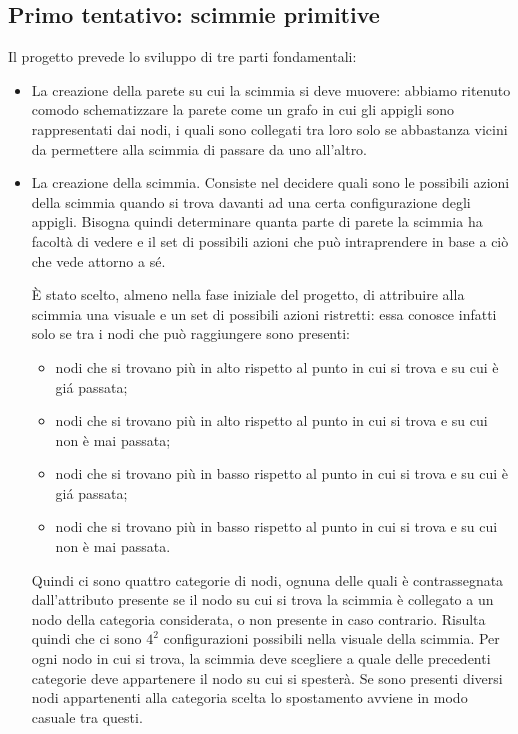 \documentclass{article}
\begin{document}
	\subsection{Primo tentativo: scimmie primitive}
	Il progetto prevede lo sviluppo di tre parti fondamentali:
	\begin{itemize}
	\item La creazione della parete su cui la scimmia si deve muovere: abbiamo ritenuto comodo schematizzare la parete come un grafo in cui gli appigli sono rappresentati dai nodi, i quali sono collegati tra loro solo se abbastanza vicini da permettere alla scimmia di passare da uno all'altro.
	\item La creazione della scimmia. Consiste nel decidere quali sono le possibili azioni della scimmia quando si trova davanti ad una certa configurazione degli appigli. Bisogna quindi determinare quanta parte di parete la scimmia ha facolt\`{a} di vedere e il set di possibili azioni che pu\`{o} intraprendere in base a ci\`{o} che vede attorno a s\'{e}. 

	\`{E} stato scelto, almeno nella fase iniziale del progetto, di attribuire alla scimmia una visuale e un set di possibili azioni ristretti: essa conosce infatti solo se tra i nodi che pu\`{o} raggiungere sono presenti:
	\begin{itemize}
		\item nodi che si trovano pi\`{u} in alto rispetto al punto in cui si trova e su cui \`{e} gi\'{a} passata;
		\item nodi che si trovano pi\`{u} in alto rispetto al punto in cui si trova e su cui non \`{e} mai passata;
		\item nodi che si trovano pi\`{u} in basso rispetto al punto in cui si trova e su cui \`{e} gi\'{a} passata;
		\item nodi che si trovano pi\`{u} in basso rispetto al punto in cui si trova e su cui non \`{e} mai passata.
	\end{itemize}

Quindi ci sono quattro categorie di nodi, ognuna delle quali \`{e} contrassegnata dall'attributo presente se il nodo su cui si trova la scimmia \`{e} collegato a un nodo della categoria considerata, o non presente in caso contrario.
Risulta quindi che ci sono $4^2$ configurazioni possibili nella visuale della scimmia.
Per ogni nodo in cui si trova, la scimmia deve scegliere a quale delle precedenti categorie deve appartenere il nodo su cui si spester\`{a}. Se sono presenti diversi nodi appartenenti alla categoria scelta lo spostamento avviene in modo casuale tra questi.


\end{itemize}
\end{document}
